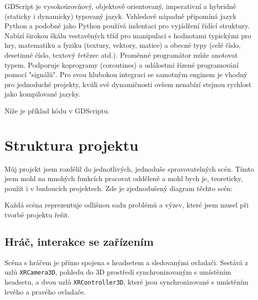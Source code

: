GDScript je vysokoúrovňový, objektově orientovaný, imperativní a hybridně (staticky i dynamicky) typovaný jazyk. Vzhledově nápadně připomíná jazyk Python a podobně jako Python používá indentaci pro vyjádření řídící struktury. Nabízí širokou škálu vestavěných tříd pro manipulaci s hodnotami typickými pro hry, matematiku a fyziku (textury, vektory, matice) a obecné typy (celé číslo, desetinné číslo, textový řetězec atd.). Proměnné programátor může anotovat typem. Podporuje koprogramy (coroutines) a událostmi řízené programování pomocí "signálů". Pro svou hlubokou integraci se samotným enginem je vhodný pro jednoduché projekty, kvůli své dynamičnosti ovšem nenabízí stejnou rychlost jako kompilované jazyky. \cite{gdscript_reference}

Níže je příklad kódu v GDScriptu.



\chapter{Struktura projektu}

\begin{samepage}
  Můj projekt jsem rozdělil do jednotlivých, jednoduše spravovatelných scén. Tímto jsem mohl na mnohých funkcích pracovat odděleně a mohl bych je, teoreticky, použít i v budoucích projektech. Zde je zjednodušený diagram těchto scén:

  \vspace{0.3cm}
  \renewcommand\DTstyle{\rmfamily}

  Každá scéna reprezentuje odlišnou sadu problémů a výzev, které jsem musel při tvorbě projektu řešit.
\end{samepage}

\section{Hráč, interakce se zařízením}

Scéna s hráčem je přímo spojena s headsetem a sledovanými ovladači. Sestává z uzlů \texttt{XRCamera3D}, pohledu do 3D prostředí synchronizovaným s umístěním headsetu, a dvou uzlů \texttt{XRController3D}, které jsou synchronizované s umístěním levého a pravého ovladače.

